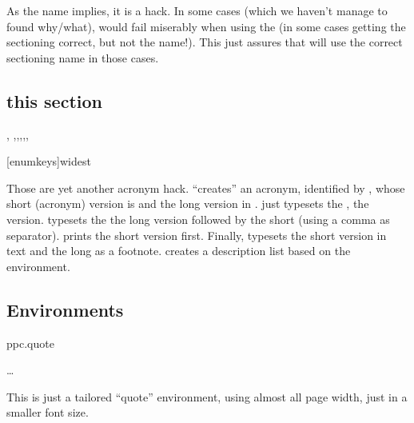 \documentclass[article,nofontwarning,nogeometry,english,tocdepth=3,secdepth=3]{ufrgscca} %
\begin{document}
\begin{codedescribe}{}
    \begin{codesyntax}%
    \end{codesyntax}
As the name implies, it is a hack. In some cases (which we haven't manage to found why/what),  would fail miserably when using the \tsmacro{\nameref}{} (in some cases getting the sectioning correct, but not the name!). This just assures that \tsmacro{\nameref}{} will use the correct sectioning name in those cases.
\begin{codestore}[st=d.labelhack]
    \section{this section}\label{somelabel}
\end{codestore}
\end{codedescribe}

\begin{codedescribe}{\acrodef, \acro,\acrol,\acrols,\acrosl,\acrofoot,\printacrolist}
    \begin{codesyntax}%
        \tsmacro{\printacrolist}[enumkeys]{widest}
    \end{codesyntax}
Those are yet another acronym hack. \tsmacro{\acrodef}{} “creates” an acronym, identified by , whose short (acronym) version is  and the long version in . \tsmacro{\acro}{} just typesets the , \tsmacro{\acrol}{} the  version.
\tsmacro{\acrols}{} typesets the the long version followed by the short (using a comma as separator).
\tsmacro{\acrosl}{} prints the short version first. Finally, \tsmacro{\acrofoot}{} typesets the short version in text and the long as a footnote. \tsmacro{\printacrolist}{} creates a description list based on the  environment.
\end{codedescribe}

\subsection{Environments}
\begin{codedescribe}[env]{ppc.quote}
    \begin{codesyntax}%
    \tsmacro{\begin{ppc.quote}}{} \ldots \tsmacro{\end{ppc.quote}}{}
    \end{codesyntax}
\end{codedescribe}
This is just a tailored “quote” environment, using almost all page width, just in a smaller font size.
\end{document}
